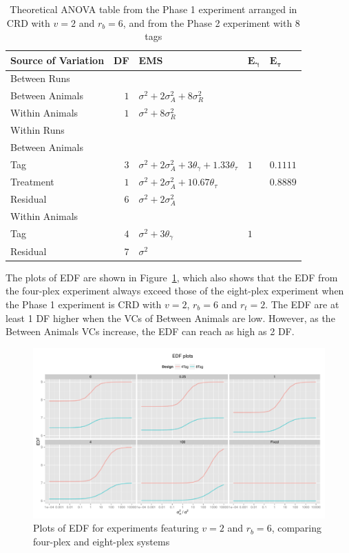 \documentclass[12pt,a4paper]{article}
\begin{document}
\begin{table}[ht]
\centering
 \caption{Theoretical ANOVA table from the Phase 1 experiment arranged in CRD with $v = 2$ and $r_b = 6$, and from the Phase 2 experiment with 8 tags}
 \begin{tabular}[t]{lrlll} 
 \toprule 
 \multicolumn{1}{l}{\textbf{Source of Variation}} & \multicolumn{1}{l}{\textbf{DF}} & \multicolumn{1}{l}{\textbf{EMS}}& \multicolumn{1}{l}{$\bm{E_{\gamma}}$}&\multicolumn{1}{l}{$\bm{E_{\tau}}$}\\ 
 \midrule 
 Between Runs &  &  & & \\ 
 \quad Between Animals & $1$ & $\sigma^2+2\sigma_{A}^2+8\sigma_{R}^2$ & & \\  \quad Within Animals & $1$ & $\sigma^2+8\sigma_{R}^2$ & & \\ \hline 
 Within Runs &  &  & & \\ 
 \quad Between Animals &  &  & & \\ 
 \quad \quad Tag & $3$ & $\sigma^2+2\sigma_{A}^2+3\theta_{\gamma}+ 1.33\theta_{\tau}$ &$1$ & $0.1111$\\ 
 \quad \quad Treatment & $1$ & $\sigma^2+2\sigma_{A}^2+10.67\theta_{\tau}$ & & $0.8889$\\ 
 \quad \quad Residual & $6$ & $\sigma^2+2\sigma_{A}^2$ & & \\ \hline 
 \quad Within Animals &  &  & & \\ 
 \quad \quad Tag & $4$ & $\sigma^2+3\theta_{\gamma}$ &$1$ & \\ 
 \quad \quad Residual & $7$ & $\sigma^2$ & & \\ 
 \bottomrule 
 \end{tabular} 
 \label{tab:ANOVAPhase1CRD12} 
\end{table} 

The plots of EDF are shown in Figure~\ref{fig:compare48CRD1}, which also shows that the EDF from the four-plex experiment always exceed those of the eight-plex experiment when the Phase 1 experiment is CRD with $v = 2$, $r_b = 6$ and $r_t = 2$. The EDF are at least 1 DF higher when the VCs of Between Animals are low. However, as the Between Animals VCs increase, the EDF can reach as high as 2 DF. 

\begin{figure}[ht]
\centering
\includegraphics[width=1 \textwidth]{Graph/CRD262Tag4vsTag8.pdf}
\caption{Plots of EDF for experiments featuring $v = 2$ and $r_b = 6$, comparing four-plex and eight-plex systems}
\label{fig:compare48CRD1}
\end{figure}
\end{document}
